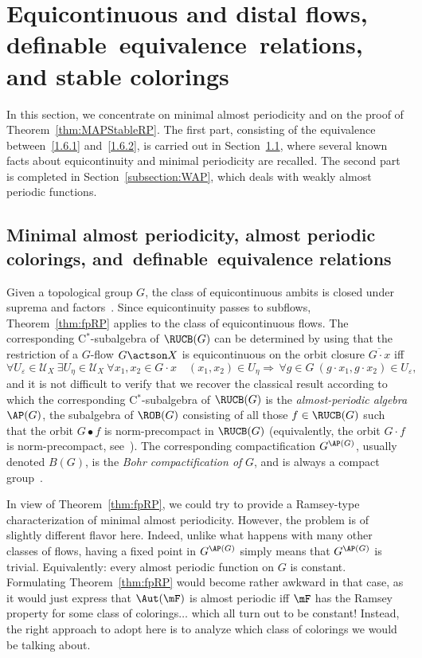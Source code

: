 \section{Equicontinuous and distal flows, definable~equivalence~relations, and stable colorings}
\label{section:map}

In this section, we concentrate on minimal almost periodicity and on the proof of Theorem~\ref{thm:MAPStableRP}. The first part, consisting of the equivalence between~\eqref{1.6.1} and~\eqref{1.6.2}, is carried out in Section~\ref{subsection:mapdefeqrel}, where several known facts about equicontinuity and minimal periodicity are recalled. The second part is completed in Section~\ref{subsection:WAP}, which deals with weakly almost periodic functions.

\subsection{Minimal almost periodicity, almost periodic colorings, and~definable~equivalence relations}
\label{subsection:mapdefeqrel}

Given a topological group $G$, the class of equicontinuous ambits is closed under suprema and factors~\cite[Chapter~IV, Section~2.27]{dV}. Since equicontinuity passes to subflows, Theorem~\ref{thm:fpRP} applies to the class of equicontinuous flows. The corresponding C$^{*}$-subalgebra of $\RUCB(G)$ can be determined by using that the restriction of a $G$-flow $G\actson X$ is equicontinuous on the orbit closure $\overline{G\cdot x}$ iff
\[
\forall U_{\varepsilon}\in \mathcal U_{X} \ \exists U_{\eta}\in \mathcal U_{X} \ \forall x_{1},x_{2}\in G\cdot x \quad (x_{1},x_{2})\in U_{\eta} \Rightarrow\, \forall g\in G \ (g\cdot x_{1}, g\cdot x_{2})\in U_{\varepsilon},
\]
and it is not difficult to verify that we recover the classical result according to which the corresponding C$^{*}$-subalgebra of $\RUCB(G)$ is the \emph{almost-periodic algebra} $\AP(G)$, the subalgebra of $\ROB(G)$ consisting of all those $f\in \RUCB(G)$ such that the orbit $G\bullet f$ is norm-precompact in $\RUCB(G)$ (equivalently, the orbit $G\cdot f$ is norm-precompact, see~\cite[Chapter~IV, Sections~5.30 and~6.15]{dV}). The corresponding compactification $G^{\AP(G)}$, usually denoted $B(G)$, is the \emph{Bohr compactification of} $G$, and is always a compact group~\cite[Appendix~(D.12)]{dV}.

In view of Theorem~\ref{thm:fpRP}, we could try to provide a Ramsey-type characterization of minimal almost periodicity. However, the problem is of slightly different flavor here. Indeed, unlike what happens with many other classes of flows, having a fixed point in $G^{\AP(G)}$ simply means that $G^{\AP(G)}$ is trivial. Equivalently: every almost periodic function on $G$ is constant. Formulating Theorem~\ref{thm:fpRP} would become rather awkward in that case, as it would just express that $\Aut(\mF)$ is almost periodic iff $\mF$ has the Ramsey property for some class of colorings$\ldots$ which all turn out to be constant! Instead, the right approach to adopt here is to analyze which class of colorings we would be talking about.

